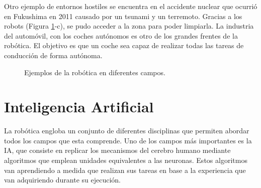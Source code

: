 Otro ejemplo de entornos hostiles se encuentra en el accidente nuclear que ocurrió en Fukushima en 2011 causado por un tsunami y un terremoto. Gracias a los robots (Figura \ref{fig:robots}-c), se pudo acceder a la zona para poder limpiarla.
La industria del automóvil, con los coches autónomos es otro de los grandes frentes de la robótica. El objetivo es que un coche sea capaz de realizar todas las tareas de conducción de forma autónoma.
\begin{figure}[h!]
  \begin{center}
    \hspace{2mm}
    \hspace{2mm}
  \end{center}
\caption[]{Ejemplos de la robótica en diferentes campos. \footnotemark} \label{fig:robots}
\end{figure}

\section{Inteligencia Artificial}
La robótica engloba un conjunto de diferentes disciplinas que permiten abordar todos los campos que esta comprende. Uno de los campos más importantes es la IA, que consiste en replicar los mecanismos del cerebro humano mediante algoritmos que emplean unidades equivalentes a las neuronas. Estos algoritmos van aprendiendo a medida que realizan sus tareas en base a la experiencia que van adquiriendo durante su ejecución.\\

